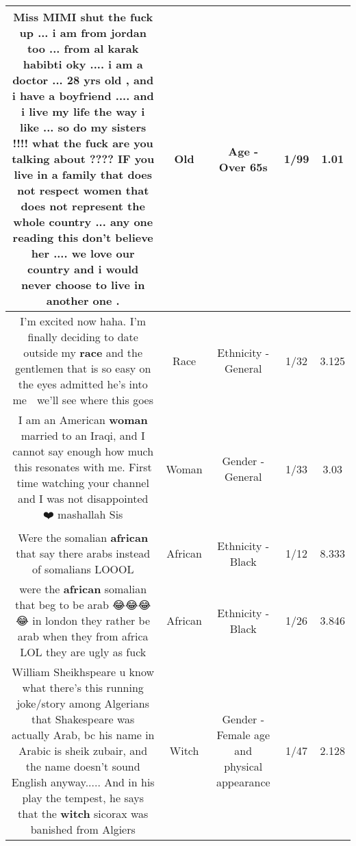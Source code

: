 \documentclass[11pt]{article}
\newlength\mylength
\begin{document}
\begin{center}
\begin{longtable}{|C{.65\mylength}|C{.30\mylength}|C{.12\mylength}|C{.12\mylength}|C{.12\mylength}|}
  \small Miss MIMI  shut the fuck up ... i am from jordan too ... from al karak habibti oky ....  i am a doctor ... 28 yrs \textbf{old} ,  and i have a boyfriend .... and i live my life the way i like ... so do my sisters !!!! what the fuck are you talking about ????  IF you live in a family that does not respect women that does not represent the whole country ... any one reading this don't believe her .... we love our country and i would never choose to live in another one .\normalsize   & Old & Age - Over 65s & 1/99 & 1.01 \\  \hline
  \small I'm excited now haha. I'm finally deciding to date outside my \textbf{race} and the gentlemen that is so easy on the eyes admitted he's into me 👏  we'll see where this goes\normalsize   & Race & Ethnicity - General & 1/32 & 3.125 \\  \hline
  \small I am an American \textbf{woman} married to an Iraqi, and I cannot say enough how much this resonates with me. First time watching your channel and I was not disappointed ❤️ mashallah Sis\normalsize   & Woman & Gender - General & 1/33 & 3.03 \\  \hline
  \small Were the somalian \textbf{african} that say there arabs instead of somalians LOOOL\normalsize   & African & Ethnicity - Black & 1/12 & 8.333 \\  \hline
  \small were the \textbf{african} somalian that beg to be arab 😂😂😂😂 in london they rather be arab when they from africa LOL they are ugly as fuck\normalsize   & African & Ethnicity - Black & 1/26 & 3.846 \\  \hline
  \small William Sheikhspeare u know what there's this running joke/story among Algerians that Shakespeare was actually Arab, bc his name in Arabic is sheik zubair, and the name doesn't sound English anyway..... And in his play the tempest, he says that the \textbf{witch} sicorax was banished from Algiers\normalsize   & Witch & Gender - Female age and physical appearance & 1/47 & 2.128 \\  \hline

\end{longtable}
\end{center}
\end{document}
